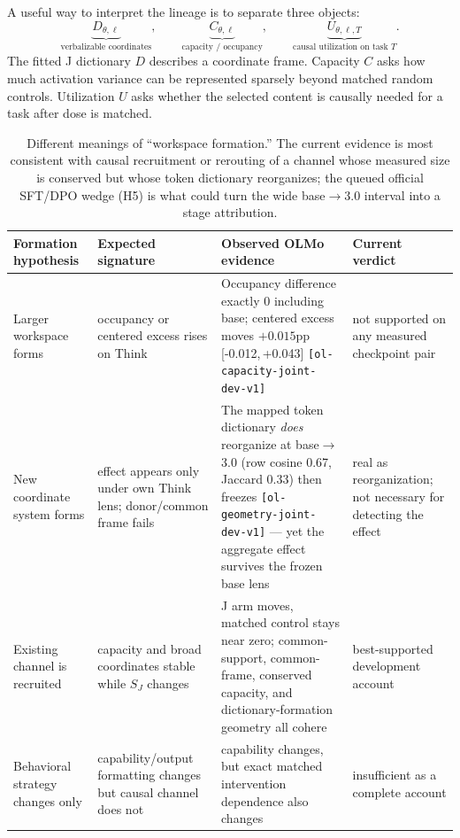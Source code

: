 \documentclass[11pt]{article}
\newcommand{\eid}[1]{{\footnotesize\nolinkurl{[#1]}}}
\newcommand{\ci}[2]{{[#1,\,#2]}}
\newcommand{\SJ}{S_J}
\begin{document}
A useful way to interpret the lineage is to separate three objects:
\[
\underbrace{D_{\theta,\ell}}_{\text{verbalizable coordinates}},\qquad
\underbrace{C_{\theta,\ell}}_{\text{capacity / occupancy}},\qquad
\underbrace{U_{\theta,\ell,T}}_{\text{causal utilization on task }T}.
\]
The fitted J dictionary $D$ describes a coordinate frame. Capacity $C$ asks
how much activation variance can be represented sparsely beyond matched random
controls. Utilization $U$ asks whether the selected content is causally needed
for a task after dose is matched.

\begin{table}[H]
\centering\small
\begin{tabularx}{\textwidth}{@{}p{}p{}X p{}@{}}
\toprule
\textbf{Formation hypothesis} & \textbf{Expected signature} & \textbf{Observed OLMo evidence} & \textbf{Current verdict}\\
\midrule
Larger workspace forms & occupancy or centered excess rises on Think & Occupancy difference exactly 0 including base; centered excess moves $+0.015$pp \ci{-0.012}{+0.043} \eid{ol-capacity-joint-dev-v1} & not supported on any measured checkpoint pair\\
New coordinate system forms & effect appears only under own Think lens; donor/common frame fails & The mapped token dictionary \emph{does} reorganize at base$\to$3.0 (row cosine 0.67, Jaccard 0.33) then freezes \eid{ol-geometry-joint-dev-v1} --- yet the aggregate effect survives the frozen base lens & real as reorganization; not necessary for detecting the effect\\
Existing channel is recruited & capacity and broad coordinates stable while $\SJ$ changes & J arm moves, matched control stays near zero; common-support, common-frame, conserved capacity, and dictionary-formation geometry all cohere & best-supported development account\\
Behavioral strategy changes only & capability/output formatting changes but causal channel does not & capability changes, but exact matched intervention dependence also changes & insufficient as a complete account\\
\bottomrule
\end{tabularx}
\caption{Different meanings of ``workspace formation.'' The current evidence
is most consistent with causal recruitment or rerouting of a channel whose
measured size is conserved but whose token dictionary reorganizes; the queued
official SFT/DPO wedge (H5) is what could turn the wide base$\to$3.0 interval
into a stage attribution.}
\label{tab:formation}
\end{table}
\end{document}
